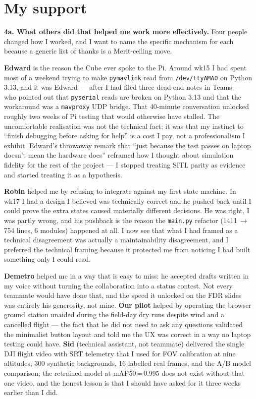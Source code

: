 \section{My support}

\textbf{4a. What others did that helped me work more effectively.} Four people changed how I worked, and I want to name the specific mechanism for each because a generic list of thanks is a Merit-ceiling move.

\textbf{Edward} is the reason the Cube ever spoke to the Pi. Around wk15 I had spent most of a weekend trying to make \texttt{pymavlink} read from \texttt{/dev/ttyAMA0} on Python 3.13, and it was Edward --- after I had filed three dead-end notes in Teams --- who pointed out that \texttt{pyserial} reads are broken on Python 3.13 and that the workaround was a \texttt{mavproxy} UDP bridge. That 40-minute conversation unlocked roughly two weeks of Pi testing that would otherwise have stalled. The uncomfortable realisation was not the technical fact; it was that my instinct to ``finish debugging before asking for help'' is a cost I pay, not a professionalism I exhibit. Edward's throwaway remark that ``just because the test passes on laptop doesn't mean the hardware does'' reframed how I thought about simulation fidelity for the rest of the project --- I stopped treating SITL parity as evidence and started treating it as a hypothesis.

\textbf{Robin} helped me by refusing to integrate against my first state machine. In wk17 I had a design I believed was technically correct and he pushed back until I could prove the extra states caused materially different decisions. He was right, I was partly wrong, and his pushback is the reason the \texttt{main.py} refactor (1411\,$\rightarrow$\,754 lines, 6 modules) happened at all. I now see that what I had framed as a technical disagreement was actually a maintainability disagreement, and I preferred the technical framing because it protected me from noticing I had built something only I could read.

\textbf{Demetro} helped me in a way that is easy to miss: he accepted drafts written in my voice without turning the collaboration into a status contest. Not every teammate would have done that, and the speed it unlocked on the FDR slides was entirely his generosity, not mine. \textbf{Our pilot} helped by operating the browser ground station unaided during the field-day dry runs despite wind and a cancelled flight --- the fact that he did not need to ask any questions validated the minimalist button layout and told me the UX was correct in a way no laptop testing could have. \textbf{Sid} (technical assistant, not teammate) delivered the single DJI flight video with SRT telemetry that I used for FOV calibration at nine altitudes, 300 synthetic backgrounds, 16 labelled real frames, and the A/B model comparison; the retrained model at mAP50\,=\,0.995 does not exist without that one video, and the honest lesson is that I should have asked for it three weeks earlier than I did.

